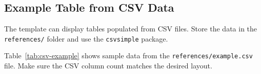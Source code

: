 \subsection{Example Table from CSV Data}

The template can display tables populated from CSV files. Store the data in the \texttt{references/} folder and use the \texttt{csvsimple} package.

\begin{table}[H]
\centering
\caption{Example table from CSV data}
\label{tab:csv-example}
\end{table}

Table~\ref{tab:csv-example} shows sample data from the \texttt{references/example.csv} file. Make sure the CSV column count matches the desired layout.
